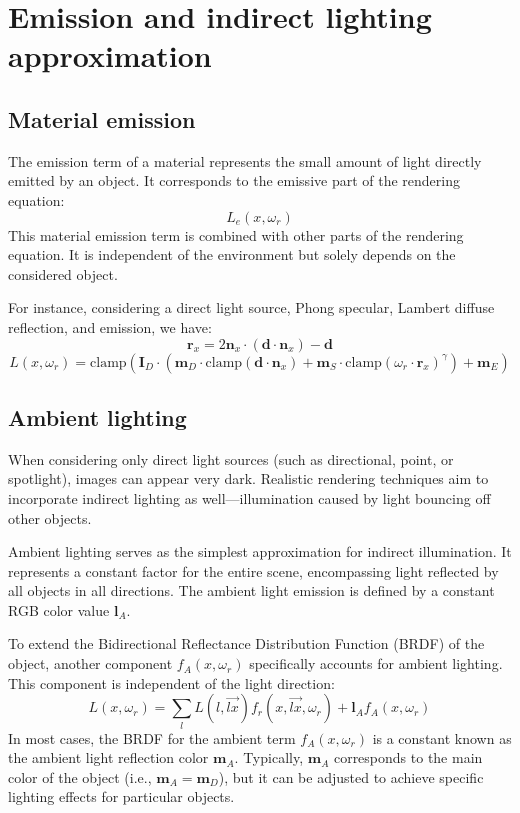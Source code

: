 \section{Emission and indirect lighting approximation}

\subsection{Material emission}
The emission term of a material represents the small amount of light directly emitted by an object. 
It corresponds to the emissive part of the rendering equation:
\[L_e(x,\omega_r)\]
This material emission term is combined with other parts of the rendering equation. 
It is independent of the environment but solely depends on the considered object.

For instance, considering a direct light source, Phong specular, Lambert diffuse reflection, and emission, we have:
\[\mathbf{r}_x=2\mathbf{n}_x\cdot(\mathbf{d}\cdot\mathbf{n}_x)-\mathbf{d}\]
\[L(x,\omega_r)= \text{clamp}(\mathbf{I}_D\cdot(\mathbf{m}_D \cdot \text{clamp}(\mathbf{d}\cdot\mathbf{n}_x)+ \mathbf{m}_S\cdot \text{clamp} (\omega_r\cdot\mathbf{r}_x)^\gamma)+ \mathbf{m}_E)\]

\subsection{Ambient lighting}
When considering only direct light sources (such as directional, point, or spotlight), images can appear very dark. 
Realistic rendering techniques aim to incorporate indirect lighting as well—illumination caused by light bouncing off other objects.

Ambient lighting serves as the simplest approximation for indirect illumination. 
It represents a constant factor for the entire scene, encompassing light reflected by all objects in all directions. 
The ambient light emission is defined by a constant RGB color value $\mathbf{l}_A$.

To extend the Bidirectional Reflectance Distribution Function (BRDF) of the object, another component $f_A(x, \omega_r)$ specifically accounts for ambient lighting. 
This component is independent of the light direction:
\[L(x,\omega_r)=\sum_lL(l,\overrightarrow{lx})f_r(x,\overrightarrow{lx},\omega_r)+\mathbf{l}_Af_A(x,\omega_r)\]
In most cases, the BRDF for the ambient term $f_A(x, \omega_r)$ is a constant known as the ambient light reflection color $\mathbf{m}_A$. 
Typically, $\mathbf{m}_A$ corresponds to the main color of the object (i.e., $\mathbf{m}_A=\mathbf{m}_D$), but it can be adjusted to achieve specific lighting effects for particular objects.


